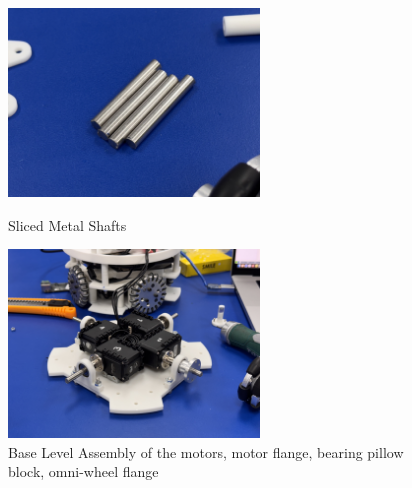 \begin{figure}[!htb]
    \begin{minipage}{0.41\textwidth}
        \includegraphics[height=5cm]{assets/images/hardware/IMG_8280.jpeg}
        \caption{Sliced Metal Shafts}
        \label{fig:metal-shafts}
        \vspace{2\baselineskip}
    \end{minipage}
    \vspace{2em} %
    \hspace{0.1\textwidth} %
    \begin{minipage}{0.41\textwidth}
        \includegraphics[height=5cm]{assets/images/hardware/IMG_8284.jpeg}
        \caption{Base Level Assembly of the motors, motor flange, bearing pillow block, omni-wheel flange}
        \label{fig:base-assembly}
    \end{minipage}
\end{figure}
